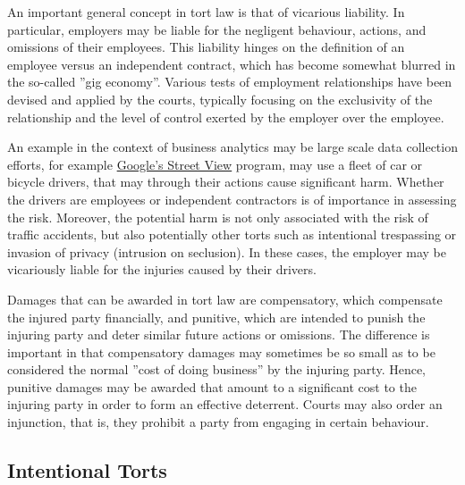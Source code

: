 An important general concept in tort law is that of vicarious liability. In particular, employers may be liable for the negligent behaviour, actions, and omissions of their employees. This liability hinges on the definition of an employee versus an independent contract, which has become somewhat blurred in the so-called ''gig economy''. Various tests of employment relationships have been devised and applied by the courts, typically focusing on the exclusivity of the relationship and the level of control exerted by the employer over the employee. 

An example in the context of business analytics may be large scale data collection efforts, for example \href{https://en.wikipedia.org/wiki/Google_Street_View}{Google's Street View} program, may use a fleet of car or bicycle drivers, that may through their actions cause significant harm. Whether the drivers are employees or independent contractors is of importance in assessing the risk. Moreover, the potential harm is not only associated with the risk of traffic accidents, but also potentially other torts such as intentional trespassing or invasion of privacy (intrusion on seclusion). In these cases, the employer may be vicariously liable for the injuries caused by their drivers. 

Damages that can be awarded in tort law are compensatory, which compensate the injured party financially, and punitive, which are intended to punish the injuring party and deter similar future actions or omissions. The difference is important in that compensatory damages may sometimes be so small as to be considered the normal ''cost of doing business'' by the injuring party. Hence, punitive damages may be awarded that amount to a significant cost to the injuring party in order to form an effective deterrent. Courts may also order an injunction, that is, they prohibit a party from engaging in certain behaviour.

\subsection*{Intentional Torts}

